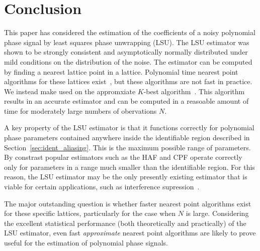 \documentclass[journal]{IEEEtran}
\begin{document}
\section{Conclusion} \label{sec:conclusion}
 
This paper has considered the estimation of the coefficients of a noisy polynomial phase signal by least squares phase unwrapping (LSU). The LSU estimator was shown to be strongly consistent and asymptotically normally distributed under mild conditions on the distribution of the noise.  The estimator can be computed by finding a nearest lattice point in a lattice. Polynomial time nearest point algorithms for these lattices exist~\cite[Sec 4.3]{McKilliam2010thesis}, but these algorithms are not fast in practice.  We instead make used on the appromxiate $K$-best algorithm~\cite{Baro_list_sphere_dec_2003,Zhan2006_K_best_sphere_decoder,Mondal_Kbest_again_2009}.  This algorithm results in an accurate estimator and can be computed in a reasoable amount of time for moderately large numbers of obervations $N$. 

A key property of the LSU estimator is that it functions correctly for polynomial phase parameters contained anywhere inside the identifiable region described in Section~\ref{sec:ident_aliasing}.  This is the maximum possible range of parameters.  By constrast popular estimators such as the HAF and CPF operate correctly only for parameters in a range much smaller than the identifiable region.  For this reason, the LSU estimator may be the only presently existing estimator that is viable for certain applications, such as interference supression~\cite{Djukanovic:2011:PMN:1950994.1951252,Djurovic_aliasing_2012}. 

The major outstanding question is whether faster nearest point algorithms exist for these specific lattices, particularly for the case when $N$ is large.  Considering the excellent statistical performance (both theoretically and practically) of the LSU estimator, even fast \emph{approximate} nearest point algorithms are likely to prove useful for the estimation of polynomial phase signals. 


 
\small 
 


\normalsize
\end{document}

